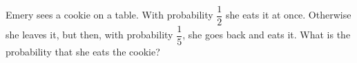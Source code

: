 Emery sees a cookie on a table. With probability $\dfrac12$ she eats it at once. Otherwise she leaves it, but then, with probability $\dfrac15$, she goes back and eats it. What is the probability that she eats the cookie?
